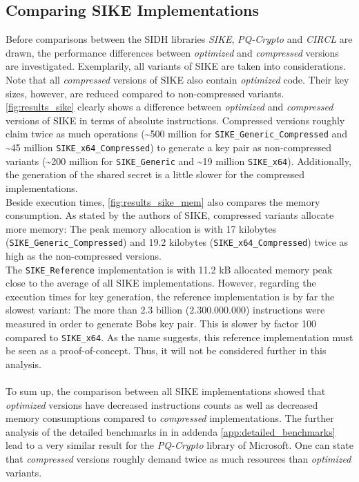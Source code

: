 \subsection{Comparing SIKE Implementations}\label{sec:analysis_sike}
Before comparisons between the SIDH libraries \textit{SIKE}, \textit{PQ-Crypto} and \textit{CIRCL} are drawn, the performance differences between \textit{optimized} and \textit{compressed} versions are investigated. Exemplarily, all variants of SIKE are taken into considerations. Note that all \textit{compressed} versions of SIKE also contain \textit{optimized} code. Their key sizes, however, are reduced compared to non-compressed variants.
\\
\autoref{fig:results_sike} clearly shows a difference between \textit{optimized} and \textit{compressed} versions of SIKE in terms of absolute instructions. Compressed versions roughly claim twice as much operations (\textasciitilde 500 million for \texttt{SIKE\_Generic\_Compressed} and \textasciitilde 45 million \texttt{SIKE\_x64\_Compressed}) to generate a key pair as non-compressed variants (\textasciitilde 200 million for \texttt{SIKE\_Generic} and \textasciitilde 19 million \texttt{SIKE\_x64}). Additionally, the generation of the shared secret is a little slower for the compressed implementations.\\
Beside execution times, \autoref{fig:results_sike_mem} also compares the memory consumption. As stated by the authors of SIKE, compressed variants allocate more memory: The peak memory allocation is with 17 kilobytes (\texttt{SIKE\_Generic\_Compressed}) and 19.2 kilobytes (\texttt{SIKE\_x64\_Compressed}) twice as high as the non-compressed versions.\\
The \texttt{SIKE\_Reference} implementation is with 11.2 kB allocated memory peak close to the average of all SIKE implementations. However, regarding the execution times for key generation, the reference implementation is by far the slowest variant: The more than 2.3 billion ($2.300.000.000$) instructions were measured in order to generate Bobs key pair. This is slower by factor 100 compared to \texttt{SIKE\_x64}. As the name suggests, this reference implementation must be seen as a proof-of-concept. Thus, it will not be considered further in this analysis.
\\\\
To sum up, the comparison between all SIKE implementations showed that \textit{optimized} versions have decreased instructions counts as well as decreased memory consumptions compared to \textit{compressed} implementations. The further analysis of the detailed benchmarks in in addenda \ref{app:detailed_benchmarks} lead to a very similar result for the \textit{PQ-Crypto} library of Microsoft.
One can state that \textit{compressed} versions roughly demand twice as much resources than \textit{optimized} variants.

